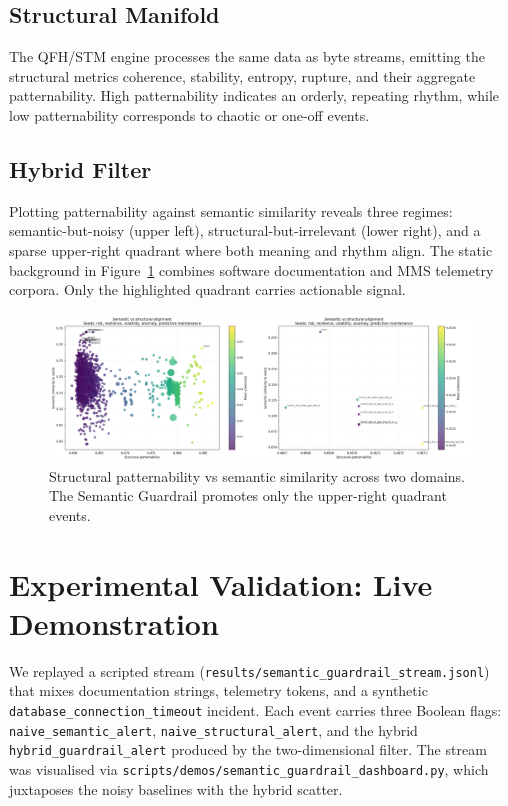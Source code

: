 \documentclass[11pt]{article}
\begin{document}
\subsection{Structural Manifold}
The QFH/STM engine processes the same data as byte streams, emitting the
structural metrics coherence, stability, entropy, rupture, and their aggregate
patternability. High patternability indicates an orderly, repeating rhythm,
while low patternability corresponds to chaotic or one-off events.

\subsection{Hybrid Filter}
Plotting patternability against semantic similarity reveals three regimes:
semantic-but-noisy (upper left), structural-but-irrelevant (lower right), and a
sparse upper-right quadrant where both meaning and rhythm align. The static
background in Figure~\ref{fig:scatter} combines software documentation and MMS
telemetry corpora. Only the highlighted quadrant carries actionable signal.
\begin{figure}[t]
  \centering
  \includegraphics[width=0.95\linewidth]{figures/semantic_bridge_combined.png}
  \caption{Structural patternability vs semantic similarity across two domains.
           The Semantic Guardrail promotes only the upper-right quadrant events.}
  \label{fig:scatter}
\end{figure}

\section{Experimental Validation: Live Demonstration}
We replayed a scripted stream (\texttt{results/semantic\_guardrail\_stream.jsonl}) that
mixes documentation strings, telemetry tokens, and a synthetic
\texttt{database\_connection\_timeout} incident. Each event carries three Boolean flags:
\texttt{naive\_semantic\_alert}, \texttt{naive\_structural\_alert}, and the hybrid
\texttt{hybrid\_guardrail\_alert} produced by the two-dimensional filter. The stream was
visualised via \texttt{scripts/demos/semantic\_guardrail\_dashboard.py}, which juxtaposes
the noisy baselines with the hybrid scatter.
\end{document}
